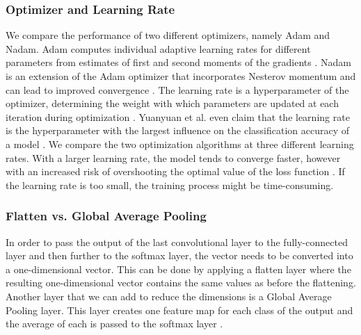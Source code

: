 \documentclass[sn-mathphys,Numbered]{sn-jnl}%
\theoremstyle{thmstyleone}%
\theoremstyle{thmstyletwo}%
\theoremstyle{thmstylethree}%
\begin{document}
\subsubsection{Optimizer and Learning Rate}\label{learningrate}
We compare the performance of two different optimizers, namely Adam and Nadam. Adam computes individual adaptive learning rates for different parameters from estimates of first and second moments of the gradients \cite{kingma2017adam}. Nadam is an extension of the Adam optimizer that incorporates Nesterov momentum and can lead to improved convergence \cite{dozat.2016}.
The learning rate is a hyperparameter of the optimizer, determining the weight with which parameters are updated at each iteration during optimization \cite{Brownlee_2020}.
Yuanyuan et al. even claim that the learning rate is the hyperparameter with the largest influence on the classification accuracy of a model \cite{Yuanyuan_2020}.
We compare the two optimization algorithms at three different learning rates.
With a larger learning rate, the model tends to converge faster, however with an increased risk of overshooting the optimal value of the loss function \cite{Brownlee_2020}.
If the learning rate is too small, the training process might be time-consuming.
\subsubsection{Flatten vs. Global Average Pooling}\label{fullyConnected}
In order to pass the output of the last convolutional layer to the fully-connected layer and then further to the softmax layer, the vector needs to be converted into a one-dimensional vector. This can be done by applying a flatten layer where the resulting one-dimensional vector contains the same values as before the flattening.\\
Another layer that we can add to reduce the dimensions is a Global Average Pooling layer. This layer creates one feature map for each class of the output and the average of each is passed to the softmax layer \cite{Admin_2023}.
\end{document}
